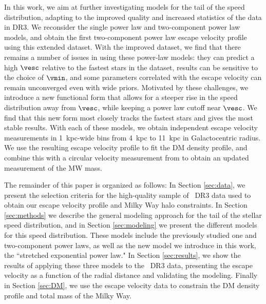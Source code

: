 In this work, we aim at further investigating models for the tail of the speed distribution, adapting to the improved quality and increased statistics of the data in \Gaia DR3.  We reconsider the single power law and  two-component power law models, and obtain the first two-component power law escape velocity profile using this extended dataset. With the improved dataset, we find that there remains a number of issues in using these power-law models: they can predict a high $\vesc$ relative to the fastest stars in the dataset, results can be sensitive to the choice of $\vmin$, and some parameters correlated with the escape velocity can remain unconverged even with wide priors. Motivated by these challenges, we introduce a new functional form that allows for a steeper rise in the speed distribution away from $\vesc$, while keeping a power law cutoff near $\vesc$. We find that this new form most closely tracks the fastest stars and gives the most stable results. With each of these models, we obtain independent escape velocity measurements in 1~kpc-wide bins from 4~kpc to 11~kpc in Galactocentric radius. We use the resulting escape velocity profile to fit the DM density profile, and combine this with a circular velocity measurement from \cite{eilers:2019} to obtain an updated measurement of the MW mass.

The remainder of this paper is organized as follows: In Section \ref{sec:data}, we present the selection criteria for the high-quality sample of \Gaia~DR3 data used to obtain our escape velocity profile and Milky Way halo constraints. In Section \ref{sec:methods} we describe the general modeling approach for the tail of the stellar speed distribution, and in Section \ref{sec:modeling} we present the different models for this speed distribution. These models include the previously studied one and two-component power laws, as well as the new model we introduce in this work, the ``stretched exponential power law." In Section \ref{sec:results}, we show the results of applying these three models to the \Gaia~DR3 data, presenting the escape velocity as a function of the radial distance and validating the modeling. Finally in Section \ref{sec:DM}, we use the escape velocity data to constrain the DM density profile and total mass of the Milky Way.